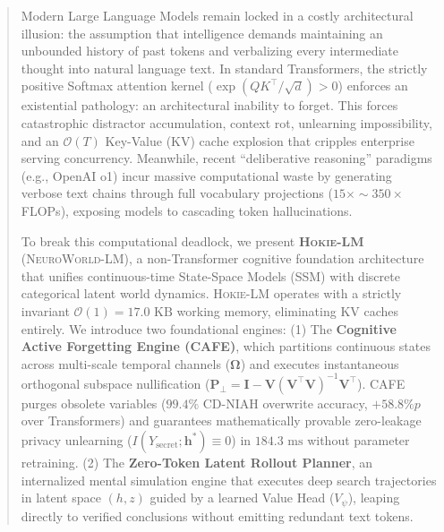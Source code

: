 \begin{abstract}
Modern Large Language Models remain locked in a costly architectural illusion: the assumption that intelligence demands maintaining an unbounded history of past tokens and verbalizing every intermediate thought into natural language text. In standard Transformers, the strictly positive Softmax attention kernel ($\exp(QK^\top/\sqrt{d}) > 0$) enforces an existential pathology: an architectural inability to forget. This forces catastrophic distractor accumulation, context rot, unlearning impossibility, and an $\mathcal{O}(T)$ Key-Value (KV) cache explosion that cripples enterprise serving concurrency. Meanwhile, recent ``deliberative reasoning'' paradigms (e.g., OpenAI o1) incur massive computational waste by generating verbose text chains through full vocabulary projections ($15\times \sim 350\times$ FLOPs), exposing models to cascading token hallucinations.

To break this computational deadlock, we present \textbf{\textsc{Hokie-LM}} (\textsc{NeuroWorld-LM}), a non-Transformer cognitive foundation architecture that unifies continuous-time State-Space Models (SSM) with discrete categorical latent world dynamics. \textsc{Hokie-LM} operates with a strictly invariant $\mathcal{O}(1) = 17.0\text{ KB}$ working memory, eliminating KV caches entirely. We introduce two foundational engines:
(1) The \textbf{Cognitive Active Forgetting Engine (CAFE)}, which partitions continuous states across multi-scale temporal channels ($\boldsymbol{\Omega}$) and executes instantaneous orthogonal subspace nullification ($\mathbf{P}_\perp = \mathbf{I} - \mathbf{V}(\mathbf{V}^\top\mathbf{V})^{-1}\mathbf{V}^\top$). CAFE purges obsolete variables ($99.4\%$ CD-NIAH overwrite accuracy, $+58.8\%p$ over Transformers) and guarantees mathematically provable zero-leakage privacy unlearning ($I(Y_{\mathrm{secret}}; \mathbf{h}^*) \equiv 0$) in $184.3\text{ ms}$ without parameter retraining.
(2) The \textbf{Zero-Token Latent Rollout Planner}, an internalized mental simulation engine that executes deep search trajectories in latent space $(h, z)$ guided by a learned Value Head ($V_\psi$), leaping directly to verified conclusions without emitting redundant text tokens.


\end{abstract}
